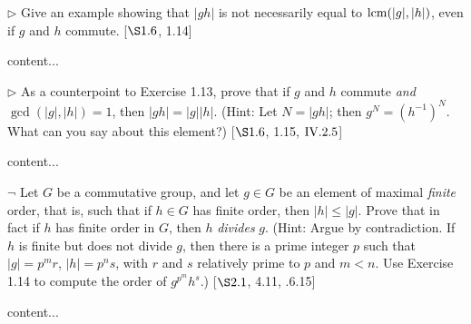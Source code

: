\begin{exercise}
	$\triangleright$ Give an example showing that $|gh|$ is not necessarily equal to $\operatorname{lcm}(|g|,|h|)$, even if $g$ and $h$ commute. [$\S 1.6$, 1.14]
\end{exercise}
\begin{solution}
	content...
\end{solution}

\begin{exercise}
	$\triangleright$ As a counterpoint to Exercise 1.13, prove that if $g$ and $h$ commute \emph{and} $\gcd(|g|,|h|) = 1$, then $|gh| = |g||h|$. (Hint: Let $N=|gh|$; then $g^N = (h^{-1})^N$. What can you say about this element?) [$\S 1.6$, 1.15, $\RNo{4}.2.5$]
\end{exercise}
\begin{solution}
	content...
\end{solution}

\begin{exercise}
	$\neg$ Let $G$ be a commutative group, and let $g\in G$ be an element of maximal \emph{finite} order, that is, such that if $h\in G$ has finite order, then $|h|\leq |g|$. Prove that in fact if $h$ has finite order in $G$, then $h$ \emph{divides} $g$. (Hint: Argue by contradiction. If $h$ is finite but does not divide $g$, then there is a prime integer $p$ such that $|g| = p^mr$, $|h| = p^ns$, with $r$ and $s$ relatively prime to $p$ and $m < n$. Use Exercise 1.14 to compute the order of $g^{p^{m}}h^s$.) [$\S 2.1$, 4.11, .6.15]
\end{exercise}
\begin{solution}
	content...
\end{solution}




